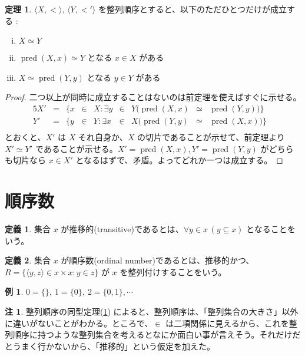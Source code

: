 \documentclass{jsarticle}
\theoremstyle{definition}
\newtheorem*{definition*}{定義}
\newtheorem{theorem}{定理}[section]
\newtheorem{remark}{注}[section]
\newtheorem{example}{例}[section]
\begin{document}
    \begin{theorem} \label{well_found_theorem}
        $\langle X, < \rangle, \, \langle Y, <' \rangle$ を整列順序とすると、以下のただひとつだけが成立する :
        \begin{enumerate}[(i)]
            \item $X \simeq Y$
            \item $\operatorname{pred}(X, x) \simeq Y$ となる $x \in X$ がある
            \item $X \simeq \operatorname{pred}(Y, y)$ となる $y \in Y$ がある
        \end{enumerate}   
    \end{theorem}
    \begin{proof}
        二つ以上が同時に成立することはないのは前定理を使えばすぐに示せる。
        \begin{alignat*}{5}
           X' &=& \{x &\in& X : \exists y &\in& Y (\operatorname{pred}(X, x) &\simeq& \operatorname{pred}(Y, y))\}&\\
           Y' &=& \{y &\in& Y : \exists x &\in& X (\operatorname{pred}(Y, y) &\simeq& \operatorname{pred}(X, x))\}&\\
        \end{alignat*}
        とおくと、$X'$ は $X$ それ自身か、$X$ の切片であることが示せて、前定理より $X' \simeq Y'$ であることが示せる。$X' = \operatorname{pred}(X, x), Y' = \operatorname{pred}(Y, y)$ がどちらも切片なら $x \in X'$ となるはずで、矛盾。よってどれか一つは成立する。
    \end{proof}
    \newpage
    
    \section{順序数}
    \begin{definition*} \label{transitive}
        集合 $x$ が推移的(transitive)であるとは、$\forall y \in x \, (y \subseteq x)$ となることをいう。
    \end{definition*}
    \begin{definition*} \label{ordinal_number}
        集合 $x$ が順序数(ordinal number)であるとは、推移的かつ、$R = \{ \langle y, z \rangle \in x \times x : y \in z\}$ が $x$ を整列付けすることをいう。
    \end{definition*}
    \begin{example}
        $0 = \{\}, \ 1 = \{0\}, \ 2 = \{0, 1\}, \cdots$
    \end{example}
    \begin{remark}
        整列順序の同型定理(\ref{well_found_theorem}) によると、整列順序は、「整列集合の大きさ」以外に違いがないことがわかる。ところで、$\in$ は二項関係に見えるから、これを整列順序に持つような整列集合を考えるとなにか面白い事が言えそう。それだけだとうまく行かないから、「推移的」という仮定を加えた。
    \end{remark}
    \vspace{1ex}
    
\end{document}
